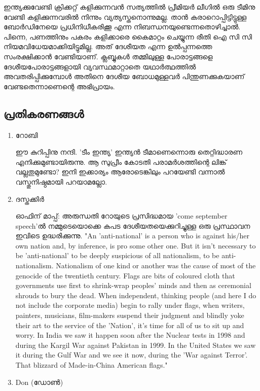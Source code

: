 ഇന്ത്യക്കുവേണ്ടി ക്രിക്കറ്റ് കളിക്കുന്നവന്‍ സത്യത്തില്‍ പ്രീമിയര്‍ ലീഗില്‍ ഒരു ടീമിനു വേണ്ടി കളിക്കുന്നവരില്‍ നിന്നും 
വ്യത്യസ്തനൊന്നുമല്ല. താന്‍ കരാറൊപ്പിട്ടിട്ടുള്ള ബോര്‍ഡിനേയെ പ്രധിനിധീകരിക്കൂ എന്ന നിബന്ധനയുണ്ടെന്നതൊഴിച്ചാല്‍. 
പിന്നെ, പണത്തിനും പകരം കളിക്കാരെ കൈമാറ്റം ചെയ്യുന്ന രീതി ഐ സി സി നിയമവിധേയമാക്കിയിട്ടുമില്ല. 
അത് ദേശീയത എന്ന ഉല്‍പ്പന്നത്തെ സംരക്ഷിക്കാന്‍ വേണ്ടിയാണ്. ക്ലബ്ബുകള്‍ തമ്മിലുള്ള പോരാട്ടങ്ങളെ 
ദേശീയപോരാട്ടങ്ങളായി വ്യവസ്ഥമാറ്റാതെ യഥാര്‍ത്ഥത്തില്‍ അവതരിപ്പിക്കുമ്പോള്‍ അതിനെ ദേശീയ ബോധമുള്ളവര്‍ 
പിന്തുണക്കുകയാണ് വേണ്ടതെന്നാണെന്റെ അഭിപ്രായം.

\subsection*{പ്രതികരണങ്ങള്‍}
\begin{enumerate}
 \item{റോബി}

ഈ കുറിപ്പിനു നന്ദി. 'ടീം ഇന്ത്യ' ഇന്ത്യന്‍ ടീമാണെന്നൊരു തെറ്റിദ്ധാരണ എനിക്കുമുണ്ടായിരുന്നു. 
ആ സുപ്രീം കോടതി പരാമര്‍ശത്തിന്റെ ലിങ്ക് വല്ലതുമുണ്ടോ? ഇനി ഇക്കാര്യം ആരോടെങ്കിലും 
പറയേണ്ടി വന്നാല്‍ വസ്തുനിഷ്ഠമായി പറയാമല്ലോ.

 \item{ദസ്തക്കിര്‍}

ഓഫിന് മാപ്പ്: അരുന്ധതി റോയുടെ പ്രസിദ്ധമായ 'come september speech'ല്‍ നമ്മുടെയൊക്കെ കപട 
ദേശീയതയെക്കുറിച്ചുള്ള ഒരു പ്രസ്ഥാവന ഇവിടെ ഉദ്ധരിക്കുന്നു. "An 'anti-national' is a person who is against his/her 
own nation and, by inference, is pro some other one. But it isn't necessary to be 'anti-national' 
to be deeply suspicious of all nationalism, to be anti-nationalism. Nationalism of one kind or 
another was the cause of most of the genocide of the twentieth century. 
Flags are bits of coloured cloth that governments use first to shrink-wrap peoples' 
minds and then as ceremonial shrouds to bury the dead. When independent, thinking people 
(and here I do not include the corporate media) begin to rally under flags, when writers, 
painters, musicians, film-makers suspend their judgment and blindly yoke their art to the service of the 'Nation', 
it's time for all of us to sit up and worry. In India we saw it happen soon after the Nuclear tests in 
1998 and during the Kargil War against Pakistan in 1999. In the United States we saw it during 
the Gulf War and we see it now, during the 'War against Terror'. 
That blizzard of Made-in-China American flags."

 \item{Don (ഡോണ്‍)}


\end{enumerate}

